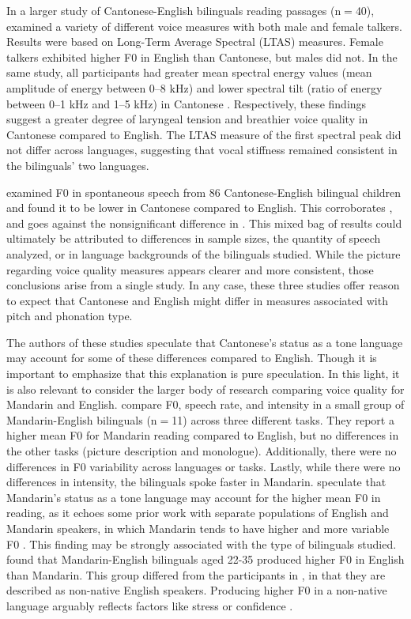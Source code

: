 In a larger study of Cantonese-English bilinguals reading passages (n$=$40), \citet{ng_2012_ltas} examined a variety of different voice measures with both male and female talkers. Results were based on Long-Term Average Spectral (LTAS) measures. Female talkers exhibited higher F0 in English than Cantonese, but males did not. In the same study, all participants had greater mean spectral energy values (mean amplitude of energy between 0--8 kHz) and lower spectral tilt (ratio of energy between 0--1 kHz and 1--5 kHz) in Cantonese \citep{ng_2012_ltas}. Respectively, these findings suggest a greater degree of laryngeal tension and breathier voice quality in Cantonese compared to English. The LTAS measure of the first spectral peak did not differ across languages, suggesting that vocal stiffness remained consistent in the bilinguals' two languages. 

\citet{ng_2010_voice} examined F0 in spontaneous speech from 86 Cantonese-English bilingual children and found it to be lower in Cantonese compared to English. This corroborates \citet{ng_2012_ltas}, and goes against the nonsignificant difference in \citep{altenberg_2006_f0}. This mixed bag of results could ultimately be attributed to differences in sample sizes, the quantity of speech analyzed, or in language backgrounds of the bilinguals studied. While the picture regarding voice quality measures appears clearer and more consistent, those conclusions arise from a single study. In any case, these three studies offer reason to expect that Cantonese and English might differ in measures associated with pitch and phonation type. 

The authors of these studies speculate that Cantonese's status as a tone language may account for some of these differences compared to English. Though it is important to emphasize that this explanation is pure speculation. In this light, it is also relevant to consider the larger body of research comparing voice quality for Mandarin and English. \citet{lee_2017_bilingual} compare F0, speech rate, and intensity in a small group of Mandarin-English bilinguals (n$=$11) across three different tasks. They report a higher mean F0 for Mandarin reading compared to English, but no differences in the other tasks (picture description and monologue). Additionally, there were no differences in F0 variability across languages or tasks. Lastly, while there were no differences in intensity, the bilinguals spoke faster in Mandarin. \citet{lee_2017_bilingual} speculate that Mandarin's status as a tone language may account for the higher mean F0 in reading, as it echoes some prior work with separate populations of English and Mandarin speakers, in which Mandarin tends to have higher and more variable F0 \citep{keating_2012_f0}. This finding may be strongly associated with the type of bilinguals studied. \citet{xue_2002_f0} found that Mandarin-English bilinguals aged 22-35 produced higher F0 in English than Mandarin. This group differed from the participants in \citet{lee_2017_bilingual}, in that they are described as non-native English speakers. Producing higher F0 in a non-native language arguably reflects factors like stress or confidence \citep{jarvinen_2013_speaking, lee_2017_bilingual}.

